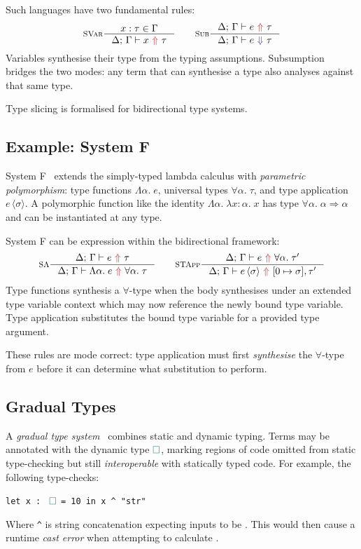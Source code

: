 Such languages have two fundamental rules:
\[\inference[\textsc{SVar}]{x : \tau \in \Gamma}{\synthesis{x}{\tau}} \qquad
  \inference[\textsc{Sub}]{\synthesis{e}{\tau}}{\analysis{e}{\tau}}\]
Variables synthesise their type from the typing assumptions. Subsumption bridges the two modes: any term that can synthesise a type also analyses against that same type.

Type slicing is formalised for bidirectional type systems.

\subsection{Example: System F}
\label{sec:system-f}

System F~\cite[ch.~23]{TAPL} extends the simply-typed lambda calculus with \textit{parametric polymorphism}: type functions $\Lambda\alpha.\; e$, universal types $\forall\alpha.\;\tau$, and type application $e\,\langle\sigma\rangle$. A polymorphic function like the identity $\Lambda\alpha.\;\lambda x \mathbin{:} \alpha.\; x$ has type $\forall\alpha.\;\alpha \Rightarrow \alpha$ and can be instantiated at any type.

System F can be expression within the bidirectional framework:
\[\inference[\textsc{S$\Lambda$}]{\synthesis{e}{\tau}}{\synthesis{\Lambda\alpha.\; e}{\forall\alpha.\;\tau}} \qquad
  \inference[\textsc{STApp}]{\synthesis{e}{\forall\alpha.\;\tau'}}{\synthesis{e\,\langle\sigma\rangle}{[0 \mapsto \sigma]\\,\tau'}}\]
Type functions synthesis a $\forall$-type when the body synthesises under an extended type variable context which may now reference the newly bound type variable. Type application substitutes the bound type variable for a provided type argument.

These rules are mode correct: type application must first \textit{synthesise} the $\forall$-type from $e$ before it can determine what substitution to perform.

\subsection{Gradual Types}
\label{sec:gradual-types}

A \textit{gradual type system}~\cite{GradualFunctional, GradualRefined} combines static and dynamic typing. Terms may be annotated with the dynamic type ${\color{teal}\Box}$, marking regions of code omitted from static type-checking but still \textit{interoperable} with statically typed code. For example, the following type-checks:
\begin{center}
\texttt{let x :\ } ${\color{teal}\Box}$ \texttt{= 10 in x \^{} "str"}
\end{center}
Where \texttt{\^{}} is string concatenation expecting inputs to be . This would then cause a runtime \textit{cast error} when attempting to calculate .

